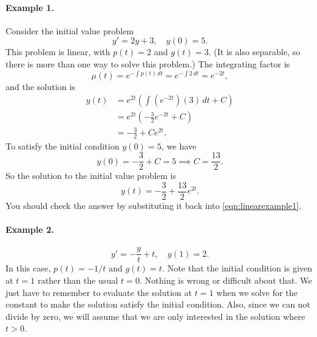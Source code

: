 \documentclass{book}
\begin{document}
\paragraph{Example 1.}
Consider the initial value problem
\begin{equation}
   y' = 2y + 3, \quad y(0) = 5.
\label{eqn:linearexample1}
\end{equation}
This problem is linear, with $p(t)=2$ and $g(t) = 3$.
(It is also separable, so there is more than one way
to solve this problem.)
The integrating factor is
\begin{equation}
   \mu(t) = e^{-\int p(t)\,dt} = e^{-\int 2\, dt}
      = e^{-2t},
\end{equation}
and the solution is
\begin{equation}
\begin{split}
   y(t) & = e^{2t} \left( \int \left(e^{-2t}\right)\left(3\right)\,dt + C\right) \\
        & = e^{2t} \left( -\frac{3}{2} e^{-2t} +C \right) \\
	& = -\frac{3}{2} + Ce^{2t}.
\end{split}
\end{equation}
To satisfy the initial condition $y(0)=5$, we have
\begin{equation}
   y(0) = -\frac{3}{2} + C = 5 \implies C = \frac{13}{2} .
\end{equation}
So the solution to the initial value problem is
\begin{equation}
   y(t) = -\frac{3}{2} + \frac{13}{2}e^{2t}.
\end{equation}
You should check the answer by substituting it back
into \eqref{eqn:linearexample1}.

\paragraph{Example 2.}
\begin{equation}
   y' = -\frac{y}{t} + t, \quad y(1) = 2.
\end{equation}
In this case, $p(t) = -1/t$ and $g(t) = t$.
Note that the initial condition is given at
$t=1$ rather than the usual $t=0$.  Nothing
is wrong or difficult about that. We just have
to remember to evaluate the solution at $t=1$
when we solve for the constant to make
the solution satisfy the initial condition.
Also, since we can not divide by zero, we will
assume that we are only interested in the solution
where $t > 0$.
\end{document}
